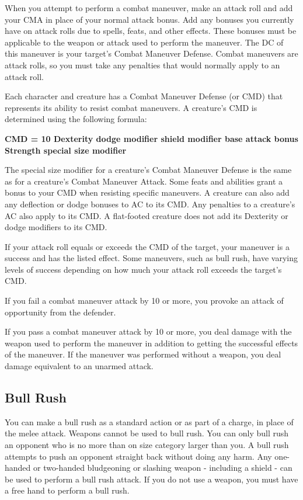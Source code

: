When you attempt to perform a combat maneuver, make an attack roll and add your CMA in place of your normal attack bonus. Add any bonuses you currently have on attack rolls due to spells, feats, and other effects. These bonuses must be applicable to the weapon or attack used to perform the maneuver. The DC of this maneuver is your target's Combat Maneuver Defense. Combat maneuvers are attack rolls, so you must take any penalties that would normally apply to an attack roll.

 Each character and creature has a Combat Maneuver Defense (or CMD) that represents its ability to resist combat maneuvers. A creature's CMD is determined using the following formula:

\textbf{\centering CMD = 10 \add Dexterity \add dodge modifier \add shield modifier \add base attack bonus \add Strength \add special size modifier}

The special size modifier for a creature's Combat Maneuver Defense is the same as for a creature's Combat Maneuver Attack. Some feats and abilities grant a bonus to your CMD when resisting specific maneuvers. A creature can also add any deflection or dodge bonuses to AC to its CMD. Any penalties to a creature's AC also apply to its CMD. A flat-footed creature does not add its Dexterity or dodge modifiers to its CMD.

 If your attack roll equals or exceeds the CMD of the target, your maneuver is a success and has the listed effect. Some maneuvers, such as bull rush, have varying levels of success depending on how much your attack roll exceeds the target's CMD.

If you fail a combat maneuver attack by 10 or more, you provoke an attack of opportunity from the defender.

If you pass a combat maneuver attack by 10 or more, you deal damage with the weapon used to perform the maneuver in addition to getting the successful effects of the maneuver. If the maneuver was performed without a weapon, you deal damage equivalent to an unarmed attack.

\subsection{Bull Rush}
You can make a bull rush as a standard action or as part of a charge, in place of the melee attack. Weapons cannot be used to bull rush. You can only bull rush an opponent who is no more than on size category larger than you. A bull rush attempts to push an opponent straight back without doing any harm. Any one-handed or two-handed bludgeoning or slashing weapon - including a shield - can be used to perform a bull rush attack. If you do not use a weapon, you must have a free hand to perform a bull rush.

